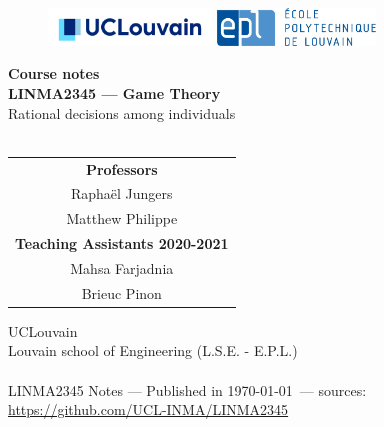 \ifx \globalmark \undefined %

\else
\fi



\begin{titlepage}
\begin{center}



\vfill

\begin{figure}[!ht]
  \centering
  \includegraphics[height = 1cm]{_UCLouvain_Logo_Impression_Positif_CMJN.jpg}
  \hfill
  \includegraphics[height = 1cm]{Logo_EPL.jpg}
\end{figure}







{ \bfseries Course notes }
\hrulefill\\[0.5cm]
\large{\textbf{LINMA2345 --- Game Theory}\\
Rational decisions among individuals} \\
\hrulefill\\[0.5cm]


\vfill
\vfill
\parbox[H][][c]{\textwidth}
	{\centering
	\begin{tabular}{c}
	\textbf{Professors}\\
	  Rapha\"el Jungers\\ Matthew Philippe\\
	\textbf{Teaching Assistants 2020-2021}\\
	 Mahsa Farjadnia\\ Brieuc Pinon
	\end{tabular}
	}\par




UCLouvain\\
Louvain school of Engineering (L.S.E. - E.P.L.)\\
$\,$\\
\tiny{LINMA2345 Notes --- Published in \monthyeardate\today $\,$ --- sources: \url{https://github.com/UCL-INMA/LINMA2345}}
\end{center}

\end{titlepage}







